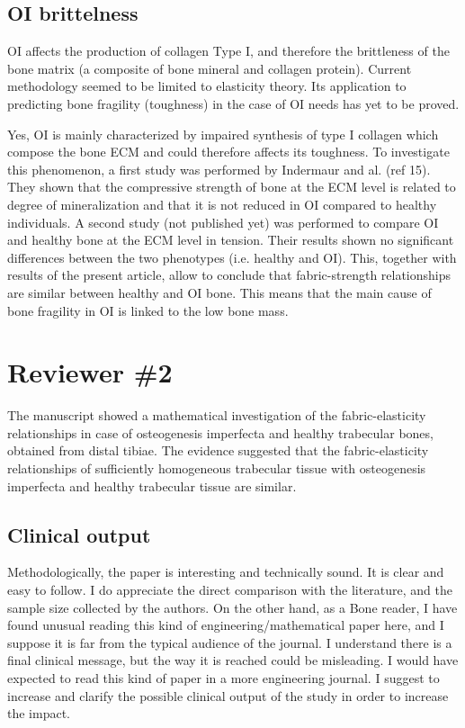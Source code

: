 \documentclass{AR2RC}
\begin{document}
\subsection{OI brittelness}

\RC OI affects the production of collagen Type I, and therefore the brittleness of the bone matrix (a composite of bone mineral and collagen protein). Current methodology seemed to be limited to elasticity theory. Its application to predicting bone fragility (toughness) in the case of OI needs has yet to be proved.

\AR Yes, OI is mainly characterized by impaired synthesis of type I collagen which compose the bone ECM and could therefore affects its toughness. To investigate this phenomenon, a first study was performed by Indermaur and al. (ref 15). They shown that the compressive strength of bone at the ECM level is related to degree of mineralization and that it is not reduced in OI compared to healthy individuals. A second study (not published yet) was performed to compare OI and healthy bone at the ECM level in tension. Their results shown no significant differences between the two phenotypes (i.e. healthy and OI). This, together with results of the present article, allow to conclude that fabric-strength relationships are similar between healthy and OI bone. This means that the main cause of bone fragility in OI is linked to the low bone mass.



\section{Reviewer \#2}

\RC The manuscript showed a mathematical investigation of the fabric-elasticity relationships in case of osteogenesis imperfecta and healthy trabecular bones, obtained from distal tibiae. The evidence suggested that the fabric-elasticity relationships of sufficiently homogeneous trabecular tissue with osteogenesis imperfecta and healthy trabecular tissue are similar.

\subsection{Clinical output}

\RC Methodologically, the paper is interesting and technically sound. It is clear and easy to follow. I do appreciate the direct comparison with the literature, and the sample size collected by the authors. On the other hand, as a Bone reader, I have found unusual reading this kind of engineering/mathematical paper here, and I suppose it is far from the typical audience of the journal. I understand there is a final clinical message, but the way it is reached could be misleading. I would have expected to read this kind of paper in a more engineering journal. I suggest to increase and clarify the possible clinical output of the study in order to increase the impact.
\end{document}

